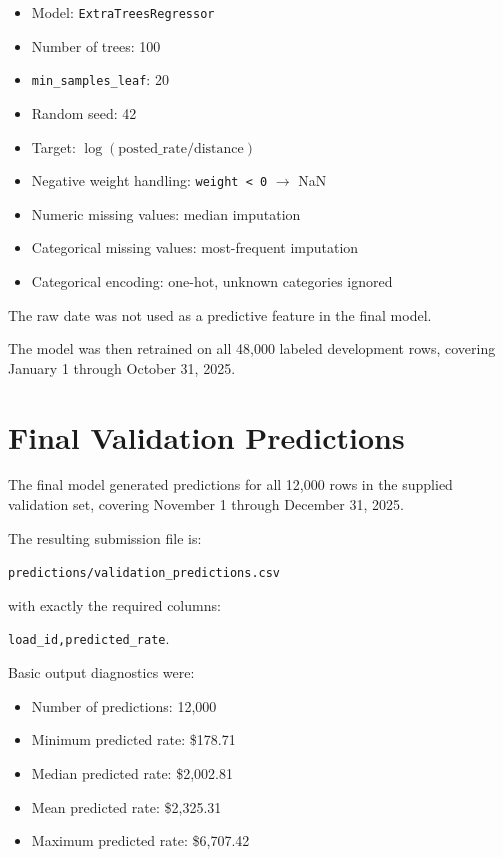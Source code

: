 \documentclass[11pt,a4paper]{article}
\newcommand{\modelname}{\texttt{ExtraTreesRegressor}}
\begin{document}
\begin{itemize}
    \item Model: \modelname{}
    \item Number of trees: 100
    \item \texttt{min\_samples\_leaf}: 20
    \item Random seed: 42
    \item Target: \(\log(\text{posted\_rate}/\text{distance})\)
    \item Negative weight handling: \texttt{weight < 0} \(\rightarrow\) NaN
    \item Numeric missing values: median imputation
    \item Categorical missing values: most-frequent imputation
    \item Categorical encoding: one-hot, unknown categories ignored
\end{itemize}

The raw date was not used as a predictive feature in the final model.

The model was then retrained on all 48,000 labeled development rows, covering January 1 through October 31, 2025.

\section{Final Validation Predictions}

The final model generated predictions for all 12,000 rows in the supplied validation set, covering November 1 through December 31, 2025.

The resulting submission file is:

\begin{center}
\texttt{predictions/validation\_predictions.csv}
\end{center}

with exactly the required columns:

\begin{center}
\texttt{load\_id,predicted\_rate}.
\end{center}

Basic output diagnostics were:

\begin{itemize}
    \item Number of predictions: 12,000
    \item Minimum predicted rate: \$178.71
    \item Median predicted rate: \$2,002.81
    \item Mean predicted rate: \$2,325.31
    \item Maximum predicted rate: \$6,707.42
\end{itemize}
\end{document}
